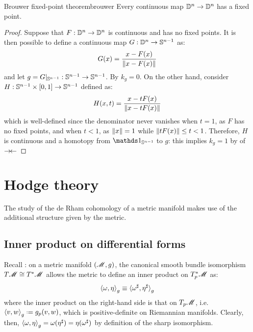 \begin{theorem}{Brouwer fixed-point theorem}{brouwer}
  Every continuous map $ \mathbb{D}^{n} \rightarrow \mathbb{D}^{n} $ has a fixed point.
\end{theorem}

\begin{proofbox}
  \begin{proof}
    Suppose that $ F : \mathbb{D}^{n} \rightarrow \mathbb{D}^{n} $ is continuous and has no fixed points. It is then possible to define a continuous map $ G : \mathbb{D}^{n} \rightarrow \mathbb{S}^{n-1} $ as:
    \begin{equation*}
      G(x) = \frac{x - F(x)}{\left\lVert x - F(x)\right\rVert}
    \end{equation*}
    and let $ g = G \vert_{\mathbb{S}^{n-1}} : \mathbb{S}^{n-1} \rightarrow \mathbb{S}^{n-1} $. By  $ k_g = 0 $. On the other hand, consider $ H : \mathbb{S}^{n-1} \times [0,1] \rightarrow \mathbb{S}^{n-1} $ defined as:
    \begin{equation*}
      H(x,t) = \frac{x - t F(x)}{\left\lVert x - t F(x)\right\rVert}
    \end{equation*}
    which is well-defined since the denominator never vanishes when $ t = 1 $, as $ F $ has no fixed points, and when $ t < 1 $, as $ \left\lVert x\right\rVert = 1 $ while $ \left\lVert t F(x)\right\rVert \leq t < 1 $. Therefore, $ H $ is continuous and a homotopy from $ \id_{\Sn{n-1}} $ to $ g $: this implies $ k_g = 1 $ by  of  $ \rightarrow \hspace{-0.15em} \leftarrow $
  \end{proof}
\end{proofbox}


\section{Hodge theory}

The study of the de Rham cohomology of a metric manifold makes use of the additional structure given by the metric.

\subsection{Inner product on differential forms}

Recall : on a metric manifold $ (\mathscr{M},g) $, the canonical smooth bundle isomorphism $ T\mathscr{M} \cong T^*\mathscr{M} $ allows the metric to define an inner product on $ T_p^*\mathscr{M} $ as:
\begin{equation*}
  \braket{\omega , \eta}_g \equiv \braket{\omega^\sharp , \eta^\sharp}_g
\end{equation*}
where the inner product on the right-hand side is that on $ T_p\mathscr{M} $, i.e. $ \braket{v,w}_g \defeq g_p(v,w) $, which is positive-definite on Riemannian manifolds. Clearly, then, $ \braket{\omega , \eta}_g = \omega(\eta^\sharp) = \eta(\omega^\sharp) $ by definition of the sharp isomorphism.

